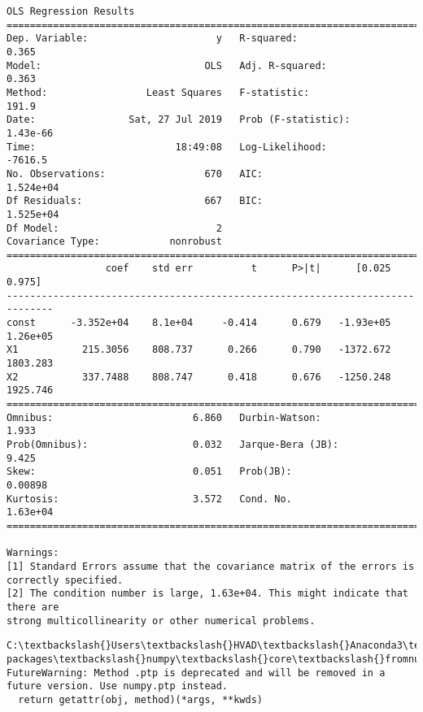\documentclass[11pt]{article}
\begin{document}
    \begin{Verbatim}[commandchars=\\\{\}]
                            OLS Regression Results                            
==============================================================================
Dep. Variable:                      y   R-squared:                       0.365
Model:                            OLS   Adj. R-squared:                  0.363
Method:                 Least Squares   F-statistic:                     191.9
Date:                Sat, 27 Jul 2019   Prob (F-statistic):           1.43e-66
Time:                        18:49:08   Log-Likelihood:                -7616.5
No. Observations:                 670   AIC:                         1.524e+04
Df Residuals:                     667   BIC:                         1.525e+04
Df Model:                           2                                         
Covariance Type:            nonrobust                                         
==============================================================================
                 coef    std err          t      P>|t|      [0.025      0.975]
------------------------------------------------------------------------------
const      -3.352e+04    8.1e+04     -0.414      0.679   -1.93e+05    1.26e+05
X1           215.3056    808.737      0.266      0.790   -1372.672    1803.283
X2           337.7488    808.747      0.418      0.676   -1250.248    1925.746
==============================================================================
Omnibus:                        6.860   Durbin-Watson:                   1.933
Prob(Omnibus):                  0.032   Jarque-Bera (JB):                9.425
Skew:                           0.051   Prob(JB):                      0.00898
Kurtosis:                       3.572   Cond. No.                     1.63e+04
==============================================================================

Warnings:
[1] Standard Errors assume that the covariance matrix of the errors is correctly specified.
[2] The condition number is large, 1.63e+04. This might indicate that there are
strong multicollinearity or other numerical problems.

    \end{Verbatim}

    \begin{Verbatim}[commandchars=\\\{\}]
C:\textbackslash{}Users\textbackslash{}HVAD\textbackslash{}Anaconda3\textbackslash{}lib\textbackslash{}site-packages\textbackslash{}numpy\textbackslash{}core\textbackslash{}fromnumeric.py:52: FutureWarning: Method .ptp is deprecated and will be removed in a future version. Use numpy.ptp instead.
  return getattr(obj, method)(*args, **kwds)

    \end{Verbatim}
\end{document}
